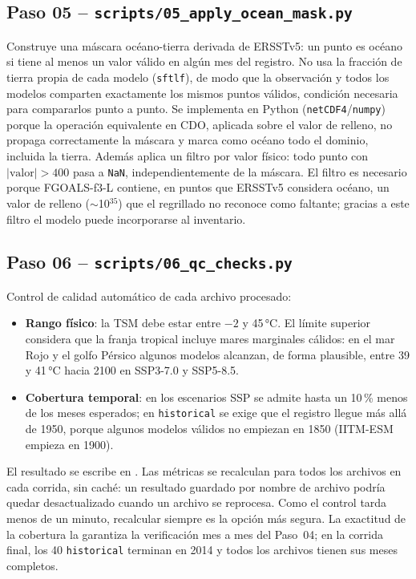 \subsection{Paso 05 -- \texttt{scripts/05\_apply\_ocean\_mask.py}}
Construye una máscara océano-tierra derivada de ERSSTv5: un punto es océano si tiene al menos un valor válido en algún mes del registro. No usa la fracción de tierra propia de cada modelo (\texttt{sftlf}), de modo que la observación y todos los modelos comparten exactamente los mismos puntos válidos, condición necesaria para compararlos punto a punto. Se implementa en Python (\texttt{netCDF4}/\texttt{numpy}) porque la operación equivalente en CDO, aplicada sobre el valor de relleno, no propaga correctamente la máscara y marca como océano todo el dominio, incluida la tierra. Además aplica un filtro por valor físico: todo punto con $|\text{valor}| > 400$ pasa a \texttt{NaN}, independientemente de la máscara. El filtro es necesario porque FGOALS-f3-L contiene, en puntos que ERSSTv5 considera océano, un valor de relleno ($\sim$10$^{35}$) que el regrillado no reconoce como faltante; gracias a este filtro el modelo puede incorporarse al inventario.

\subsection{Paso 06 -- \texttt{scripts/06\_qc\_checks.py}}
Control de calidad automático de cada archivo procesado:
\begin{itemize}
\item \textbf{Rango físico}: la TSM debe estar entre $-2$ y 45\,°C. El límite superior considera que la franja tropical incluye mares marginales cálidos: en el mar Rojo y el golfo Pérsico algunos modelos alcanzan, de forma plausible, entre 39 y 41\,°C hacia 2100 en SSP3-7.0 y SSP5-8.5.
\item \textbf{Cobertura temporal}: en los escenarios SSP se admite hasta un 10\,\% menos de los meses esperados; en \texttt{historical} se exige que el registro llegue más allá de 1950, porque algunos modelos válidos no empiezan en 1850 (IITM-ESM empieza en 1900).
\end{itemize}
El resultado se escribe en . Las métricas se recalculan para todos los archivos en cada corrida, sin caché: un resultado guardado por nombre de archivo podría quedar desactualizado cuando un archivo se reprocesa. Como el control tarda menos de un minuto, recalcular siempre es la opción más segura. La exactitud de la cobertura la garantiza la verificación mes a mes del Paso~04; en la corrida final, los 40 \texttt{historical} terminan en 2014 y todos los archivos tienen sus meses completos.


